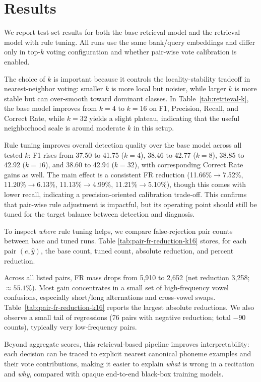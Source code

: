 \documentclass[11pt]{article}
\begin{document}
\section{Results}

We report test-set results for both the base retrieval model and the retrieval model with rule tuning. All runs use the same bank/query embeddings and differ only in top-$k$ voting configuration and whether pair-wise vote calibration is enabled.

The choice of $k$ is important because it controls the locality-stability tradeoff in nearest-neighbor voting: smaller $k$ is more local but noisier, while larger $k$ is more stable but can over-smooth toward dominant classes. In Table~\ref{tab:retrieval-k}, the base model improves from $k{=}4$ to $k{=}16$ on F1, Precision, Recall, and Correct Rate, while $k{=}32$ yields a slight plateau, indicating that the useful neighborhood scale is around moderate $k$ in this setup.

Rule tuning improves overall detection quality over the base model across all tested $k$: F1 rises from 37.50 to 41.75 ($k{=}4$), 38.46 to 42.77 ($k{=}8$), 38.85 to 42.92 ($k{=}16$), and 38.60 to 42.94 ($k{=}32$), with corresponding Correct Rate gains as well. The main effect is a consistent FR reduction (11.66\%$\rightarrow$7.52\%, 11.20\%$\rightarrow$6.13\%, 11.13\%$\rightarrow$4.99\%, 11.21\%$\rightarrow$5.10\%), though this comes with lower recall, indicating a precision-oriented calibration trade-off. This confirms that pair-wise rule adjustment is impactful, but its operating point should still be tuned for the target balance between detection and diagnosis.

To inspect \emph{where} rule tuning helps, we compare false-rejection pair counts between base and tuned runs. Table \ref{tab:pair-fr-reduction-k16} stores, for each pair \((e,\hat{y})\), the base count, tuned count, absolute reduction, and percent reduction.

Across all listed pairs, FR mass drops from 5{,}910 to 2{,}652 (net reduction 3{,}258; \(\approx 55.1\%\)).
Most gain concentrates in a small set of high-frequency vowel confusions, especially short/long alternations and cross-vowel swaps.
Table~\ref{tab:pair-fr-reduction-k16} reports the largest absolute reductions.
We also observe a small tail of regressions (76 pairs with negative reduction; total \(-90\) counts), typically very low-frequency pairs.

Beyond aggregate scores, this retrieval-based pipeline improves interpretability: each decision can be traced to explicit nearest canonical phoneme examples and their vote contributions, making it easier to explain \emph{what} is wrong in a recitation and \emph{why}, compared with opaque end-to-end black-box training models.
\end{document}
